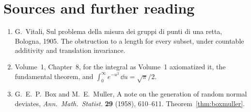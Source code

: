 \section*{Sources and further reading}

\begin{enumerate}
\item G.~Vitali, Sul problema della misura dei gruppi di punti di una retta, Bologna, 1905. The obstruction to a length for every subset, under countable additivity and translation invariance.
\item Volume~1, Chapter~8, for the integral as Volume~1 axiomatized it, the fundamental theorem, and $\int_0^{\infty}e^{-u^2}\,\dd u=\sqrt{\pi}/2$.
\item G.~E.~P.~Box and M.~E.~Muller, A note on the generation of random normal deviates, \emph{Ann.\ Math.\ Statist.} \textbf{29} (1958), 610--611. Theorem~\ref{thm:boxmuller}.
\end{enumerate}
